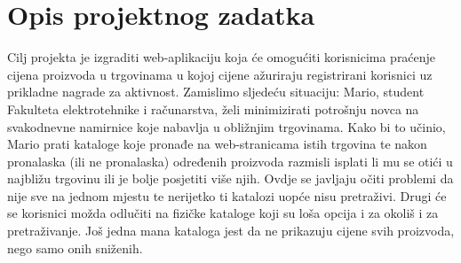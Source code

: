 \chapter{Opis projektnog zadatka}
		
		
		
		Cilj projekta je izgraditi web-aplikaciju koja će omogućiti korisnicima praćenje cijena proizvoda u trgovinama u kojoj cijene ažuriraju registrirani korisnici uz prikladne nagrade za aktivnost. Zamislimo sljedeću situaciju: Mario, student Fakulteta elektrotehnike i računarstva, želi minimizirati potrošnju novca na svakodnevne namirnice koje nabavlja u obližnjim trgovinama. Kako bi to učinio, Mario prati kataloge koje pronađe na web-stranicama istih trgovina te nakon pronalaska (ili ne pronalaska) određenih proizvoda razmisli isplati li mu se otići u najbližu trgovinu ili je bolje posjetiti više njih. Ovdje se javljaju očiti problemi da nije sve na jednom mjestu te nerijetko ti katalozi uopće nisu pretraživi. Drugi će se korisnici možda odlučiti na fizičke kataloge koji su loša opcija i za okoliš i za pretraživanje. Još jedna mana kataloga jest da ne prikazuju cijene svih proizvoda, nego samo onih sniženih.\\
		
